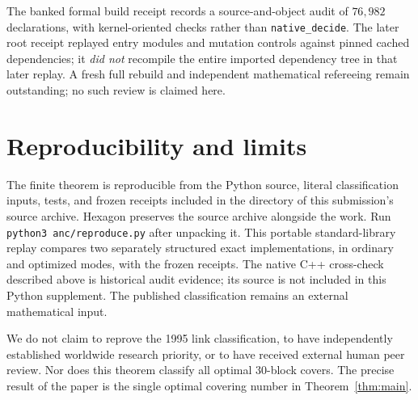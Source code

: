 \documentclass[11pt]{article}
\theoremstyle{definition}
\theoremstyle{remark}
\begin{document}
The banked formal build receipt records a source-and-object audit of
$76{,}982$ declarations, with kernel-oriented checks rather than
\texttt{native\_decide}. The later root receipt replayed entry
modules and mutation controls against pinned cached dependencies; it
\emph{did not} recompile the entire imported dependency tree in that
later replay. A fresh full rebuild and independent mathematical
refereeing remain outstanding; no such review is claimed here.

\section{Reproducibility and limits}
The finite theorem is reproducible from the Python source, literal
classification inputs, tests, and frozen receipts included in the
 directory of this submission's source archive. Hexagon
preserves the source archive alongside the work. Run
\texttt{python3 anc/reproduce.py} after unpacking it. This portable
standard-library replay compares two separately structured exact
implementations, in ordinary and optimized modes, with the frozen
receipts. The native C++ cross-check described above is historical
audit evidence; its source is not included in this Python supplement.
The published classification remains an external mathematical input.

We do not claim to reprove the 1995 link classification, to have
independently established worldwide research priority, or to have
received external human peer review. Nor does this theorem classify
all optimal $30$-block covers. The precise result of the paper is the
single optimal covering number in Theorem~\ref{thm:main}.

\appendix
\end{document}
